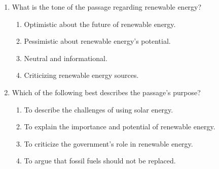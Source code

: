 \documentclass[12pt]{article}
\begin{document}
\begin{enumerate}
    \item What is the tone of the passage regarding renewable energy?
    \begin{enumerate}[label=\Alph*.]
        \item Optimistic about the future of renewable energy.
        \item Pessimistic about renewable energy's potential.
        \item Neutral and informational.
        \item Criticizing renewable energy sources.
    \end{enumerate}
    \vspace{0.5cm}

    \item Which of the following best describes the passage’s purpose?
    \begin{enumerate}[label=\Alph*.]
        \item To describe the challenges of using solar energy.
        \item To explain the importance and potential of renewable energy.
        \item To criticize the government’s role in renewable energy.
        \item To argue that fossil fuels should not be replaced.
    \end{enumerate}
    \vspace{0.5cm}

\end{enumerate}
\end{document}
